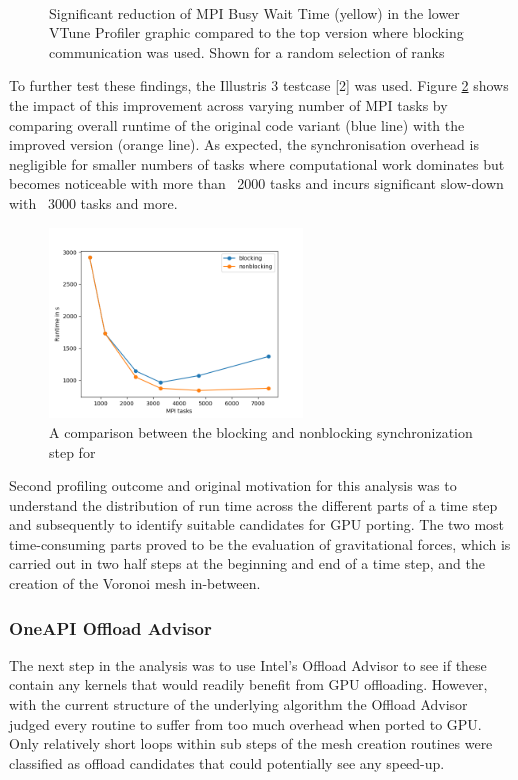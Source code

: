 \documentclass[../main]{subfiles}
\begin{document}
\begin{figure}[htp]
	\centering
	\\
	\caption{Significant reduction of MPI Busy Wait Time (yellow) in the lower VTune Profiler graphic compared to the top version where blocking communication was used. Shown for a random selection of ranks}
	\label{fig:arepo_mpicom} %
\end{figure}
To further test these findings, the Illustris 3 testcase [2] was used. Figure \ref{fig:arepo_blockvsnonblock} shows the impact of this improvement across varying number of MPI tasks by comparing overall runtime of the original code variant (blue line) with the improved version (orange line). As expected, the synchronisation overhead is negligible for smaller numbers of tasks where computational work dominates but becomes noticeable with more than ~2000 tasks and incurs significant slow-down with ~3000 tasks and more.  
\begin{figure}[htp]
	\centering
	\includegraphics[clip,width=0.6\textwidth]{images/Arepo_blockingvsNonblocking.png}
	\caption{A comparison between the blocking and nonblocking synchronization step for }
	\label{fig:arepo_blockvsnonblock} %
\end{figure}
Second profiling outcome and original motivation for this analysis was to understand the distribution of run time across the different parts of a time step and subsequently to identify suitable candidates for GPU porting.
The two most time-consuming parts proved to be the evaluation of gravitational forces, which is carried out in two half steps at the beginning and end of a time step, and the creation of the Voronoi mesh in-between. 

 \subsubsection{OneAPI Offload Advisor}
The next step in the analysis was to use Intel's Offload Advisor to see if these contain any kernels that would readily benefit from GPU offloading.
However, with the current structure of the underlying algorithm the Offload Advisor judged every routine to suffer from too much overhead when ported to GPU.
Only relatively short loops within sub steps of the mesh creation routines were classified as offload candidates that could potentially see any speed-up.
\end{document}
